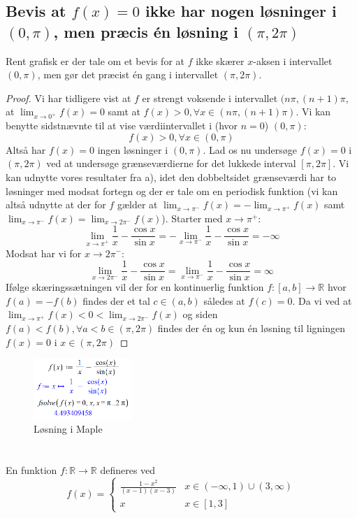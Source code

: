 \documentclass{report}
\begin{document}
\subsection{Bevis at $f(x)=0$ ikke har nogen løsninger i $(0,\pi)$, men præcis én løsning i $(\pi,2\pi)$}
Rent grafisk er der tale om et bevis for at $f$ ikke skærer $x$-aksen i intervallet $(0,\pi)$, men gør det præcist én gang i intervallet $(\pi,2\pi)$.
\begin{proof}
Vi har tidligere vist at $f$ er strengt voksende i intervallet $(n\pi,(n+1)\pi$, at $\lim_{x\to0^+}f(x)=0$ samt at $f(x)>0,\forall x\in(n\pi,(n+1)\pi)$. Vi kan benytte sidstnævnte til at vise værdiintervallet i \small{(hvor $n=0$)} $(0,\pi)$:$$f(x)>0,\forall x\in(0,\pi)$$Altså har $f(x)=0$ ingen løsninger i $(0,\pi)$. Lad os nu undersøge $f(x)=0$ i $(\pi,2\pi)$ ved at undersøge grænseværdierne for det lukkede interval $[\pi,2\pi]$. Vi kan udnytte vores resultater fra a), idet den dobbeltsidet grænseværdi har to løsninger med modsat fortegn og der er tale om en periodisk funktion (vi kan altså udnytte at der for $f$ gælder at $\lim_{x\to\pi^-}f(x)=-\lim_{x\to\pi^+}f(x)$ samt $\lim_{x\to\pi^-}f(x)=\lim_{x\to2\pi^-}f(x)$). Starter med $x\to\pi^+$:$$\lim_{x\to\pi^+}\frac{1}{x}-\frac{\cos{x}}{\sin{x}}=-\lim_{x\to\pi^-}\frac{1}{x}-\frac{\cos{x}}{\sin{x}}=-\infty$$Modsat har vi for $x\to2\pi^-$:$$\lim_{x\to2\pi^-}\frac{1}{x}-\frac{\cos{x}}{\sin{x}}=\lim_{x\to\pi^-}\frac{1}{x}-\frac{\cos{x}}{\sin{x}}=\infty$$
Ifølge skæringssætningen vil der for en kontinuerlig funktion $f:[a,b]\to\mathbb{R}$ hvor $f(a)=-f(b)$ findes der et tal $c\in(a,b)$ således at $f(c)=0$. Da vi ved at $\lim_{x\to\pi^+}f(x)<0<\lim_{x\to2\pi^-}f(x)$ og siden $f(a)<f(b),\forall a<b\in(\pi,2\pi)$ findes der én og kun én løsning til ligningen $f(x)=0$ i $x\in(\pi,2\pi)$
\end{proof}
\begin{figure}[H]
    \centering
    \includegraphics[width=0.33\textwidth]{21c.png}
    \caption{Løsning i Maple}
\end{figure}

\section{}
En funktion $f:\mathbb{R}\longrightarrow\mathbb{R}$ defineres ved$$f(x)=\begin{cases}\frac{1-x^2}{(x-1)(x-3)}&x\in(-\infty,1)\cup(3,\infty)\\x&x\in[1,3]\end{cases}$$
\end{document}
